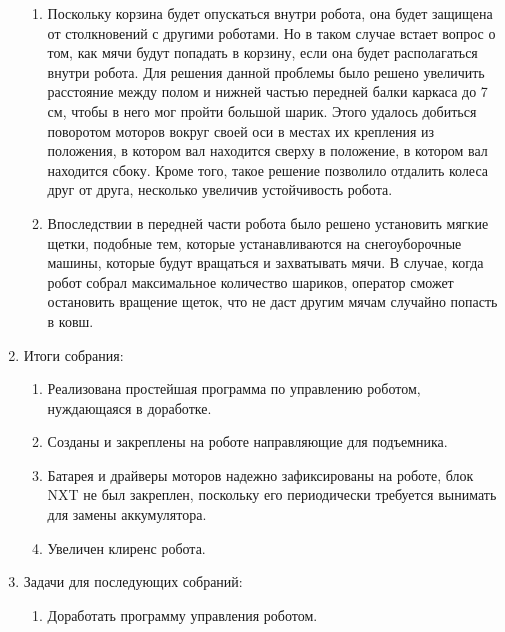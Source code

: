 \begin{enumerate}
\begin{enumerate}
      \item Поскольку корзина будет опускаться внутри робота, она будет защищена от столкновений с другими роботами. Но в таком случае встает вопрос о том, как мячи будут попадать в корзину, если она будет располагаться внутри робота. Для решения данной проблемы было решено увеличить расстояние между полом и нижней частью передней балки каркаса до 7 см, чтобы в него мог пройти большой шарик. Этого удалось добиться поворотом моторов вокруг своей оси в местах их крепления из положения, в котором вал находится сверху в положение, в котором вал находится сбоку. Кроме того, такое решение позволило отдалить колеса друг от друга, несколько увеличив устойчивость робота.\newline
        
      \item Впоследствии в передней части робота было решено установить мягкие щетки, подобные тем, которые устанавливаются на снегоуборочные машины, которые будут вращаться и захватывать мячи. В случае, когда робот собрал максимальное количество шариков, оператор сможет остановить вращение щеток, что не даст другим мячам случайно попасть в ковш.\newline
      
    \end{enumerate}
    
	\item Итоги собрания: \newline
	\begin{enumerate}
	  \item  Реализована простейшая программа по управлению роботом, нуждающаяся в доработке.\newline
	  
      \item  Созданы и закреплены на роботе направляющие для подъемника.\newline
      
      \item  Батарея и драйверы моторов надежно зафиксированы на роботе, блок NXT не был закреплен, поскольку его периодически требуется вынимать для замены аккумулятора.\newline
      
      \item  Увеличен клиренс робота.\newline
      
    \end{enumerate}
    
	\item Задачи для последующих собраний:\newline
	\begin{enumerate}
	  \item Доработать программу управления роботом.\newline
	  

\end{enumerate}
\end{enumerate}
